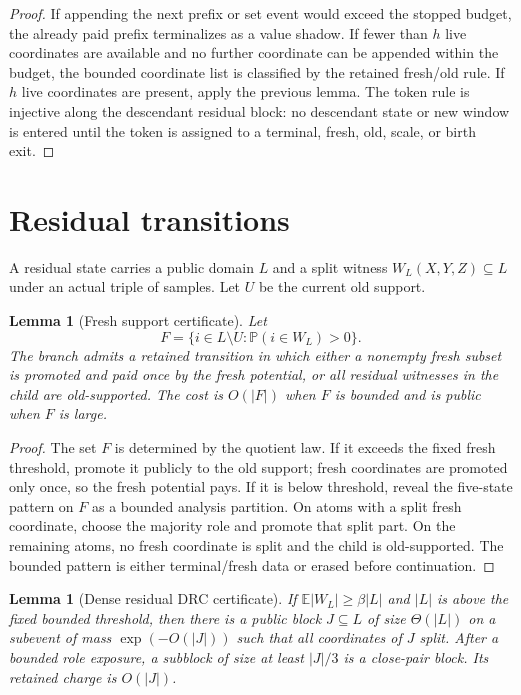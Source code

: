 \documentclass[11pt]{article}
\newtheorem{lemma}[theorem]{Lemma}
\theoremstyle{remark}
\newcommand{\E}{\mathbb E}
\newcommand{\Prob}{\mathbb P}
\begin{document}
\begin{proof}
If appending the next prefix or set event would exceed the stopped budget, the already paid prefix terminalizes as a value shadow.  If fewer than $h$ live coordinates are available and no further coordinate can be appended within the budget, the bounded coordinate list is classified by the retained fresh/old rule.  If $h$ live coordinates are present, apply the previous lemma.  The token rule is injective along the descendant residual block: no descendant state or new window is entered until the token is assigned to a terminal, fresh, old, scale, or birth exit.
\end{proof}

\section{Residual transitions}\label{app:residual}

A residual state carries a public domain $L$ and a split witness $W_L(X,Y,Z)\subseteq L$ under an actual triple of samples.  Let $U$ be the current old support.

\begin{lemma}[Fresh support certificate]\label{lem:app-fresh}
Let
\[
        F=\{i\in L\setminus U:\Prob(i\in W_L)>0\}.
\]
The branch admits a retained transition in which either a nonempty fresh subset is promoted and paid once by the fresh potential, or all residual witnesses in the child are old-supported.  The cost is $O(|F|)$ when $F$ is bounded and is public when $F$ is large.
\end{lemma}

\begin{proof}
The set $F$ is determined by the quotient law.  If it exceeds the fixed fresh threshold, promote it publicly to the old support; fresh coordinates are promoted only once, so the fresh potential pays.  If it is below threshold, reveal the five-state pattern on $F$ as a bounded analysis partition.  On atoms with a split fresh coordinate, choose the majority role and promote that split part.  On the remaining atoms, no fresh coordinate is split and the child is old-supported.  The bounded pattern is either terminal/fresh data or erased before continuation.
\end{proof}

\begin{lemma}[Dense residual DRC certificate]\label{lem:app-dense}
If $\E|W_L|\ge \beta |L|$ and $|L|$ is above the fixed bounded threshold, then there is a public block $J\subseteq L$ of size $\Theta(|L|)$ on a subevent of mass $\exp(-O(|J|))$ such that all coordinates of $J$ split.  After a bounded role exposure, a subblock of size at least $|J|/3$ is a close-pair block.  Its retained charge is $O(|J|)$.
\end{lemma}
\end{document}
